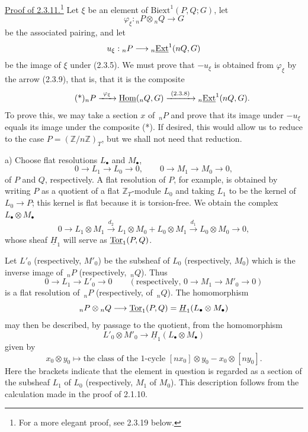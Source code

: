 
\medskip
\noindent\underline{Proof of 2.3.11.}\footnote{For a more elegant
proof, see 2.3.19 below.}
Let $\xi$ be an element of $\mathrm{Biext}^1(P,Q;G)$, let
\[
 \varphi_\xi:{}_nP\otimes{}_nQ\longrightarrow G
\]
be the associated pairing, and let
\[
 u_\xi:{}_nP\longrightarrow{}_n\uExt^1(nQ,G)
\]
be the image of $\xi$ under (2.3.5).  We must prove that $-u_\xi$ is
obtained from $\varphi_\xi$ by the arrow (2.3.9), that is, that it is
the composite
\begin{equation}\tag{*}
 {}_nP
 \xrightarrow{\ \varphi_\xi\ }
 \uHom({}_nQ,G)
 \xrightarrow{\ (2.3.8)\ }
 {}_n\uExt^1(nQ,G).
\end{equation}
To prove this, we may take a section $x$ of $\,{}_nP$ and prove that
its image under $-u_\xi$ equals its image under the composite (*).
If desired, this would allow us to reduce to the case
$P=(\mathbb Z/n\mathbb Z)_T$, but we shall not need that reduction.

\medskip
\noindent a) Choose flat resolutions $L_\bullet$ and $M_\bullet$,
\[
 0\longrightarrow L_1\longrightarrow L_0\longrightarrow0,
 \qquad
 0\longrightarrow M_1\longrightarrow M_0\longrightarrow0,
\]
of $P$ and $Q$, respectively.  A flat resolution of $P$, for example,
is obtained by writing $P$ as a quotient of a flat
$\mathbb Z_T$-module $L_0$ and taking $L_1$ to be the kernel of
$L_0\longrightarrow P$; this kernel is flat because it is
torsion-free.  We obtain the complex $L_\bullet\otimes M_\bullet$
\[
 0\longrightarrow L_1\otimes M_1
 \xrightarrow{d_2}
 L_1\otimes M_0+L_0\otimes M_1
 \xrightarrow{d_1}
 L_0\otimes M_0
 \longrightarrow0,
\]
whose sheaf $\underline H_1$ will serve as $\uTor_1(P,Q)$.

Let $L'_0$ (respectively, $M'_0$) be the subsheaf of $L_0$
(respectively, $M_0$) which is the inverse image of $\,{}_nP$
(respectively, $\,{}_nQ$).  Thus
\[
 0\longrightarrow L_1\longrightarrow L'_0\longrightarrow0
 \qquad
 \left(\text{respectively, }
 0\longrightarrow M_1\longrightarrow M'_0\longrightarrow0\right)
\]
is a flat resolution of $\,{}_nP$ (respectively, of $\,{}_nQ$).  The
homomorphism
\[
 {}_nP\otimes{}_nQ
 \longrightarrow
 \uTor_1(P,Q)=\underline H_1(L_\bullet\otimes M_\bullet)
\]
may then be described, by passage to the quotient, from the
homomorphism
\[
 L'_0\otimes M'_0
 \longrightarrow
 \underline H_1(L_\bullet\otimes M_\bullet)
\]
given by
\[
 x_0\otimes y_0
 \longmapsto
 \text{the class of the $1$-cycle }
 [nx_0]\otimes y_0-x_0\otimes[ny_0].
\]
Here the brackets indicate that the element in question is regarded
as a section of the subsheaf $L_1$ of $L_0$ (respectively, $M_1$ of
$M_0$).  This description follows from the calculation made in the
proof of 2.1.10.

